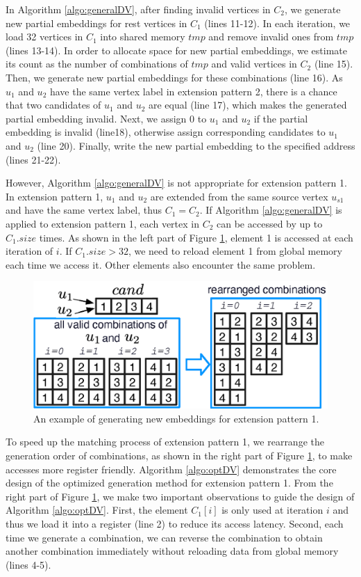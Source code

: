 In Algorithm \ref{algo:generalDV}, after finding invalid vertices in $C_2$, we generate new partial embeddings for rest vertices in $C_1$ (lines 11-12). In each iteration, we load 32 vertices in $C_1$ into shared memory $tmp$ and remove invalid ones from $tmp$ (lines 13-14). In order to allocate space for new partial embeddings, we estimate its count as the number of combinations of $tmp$ and valid vertices in $C_2$ (line 15). Then, we generate new partial embeddings for these combinations (line 16). As $u_1$ and $u_2$ have the same vertex label in extension pattern 2, there is a chance that two candidates of $u_1$ and $u_2$ are equal (line 17), which makes the generated partial embedding invalid. Next, we assign 0 to $u_1$ and $u_2$ if the partial embedding is invalid (line18), otherwise assign corresponding candidates to $u_1$ and $u_2$ (line 20). Finally, write the new partial embedding to the specified address (lines 21-22).

However, Algorithm \ref{algo:generalDV} is not appropriate for extension pattern 1. In extension pattern 1, $u_1$ and $u_2$ are extended from the same source vertex $u_{s1}$ and have the same vertex label, thus $C_1 = C_2$. If Algorithm \ref{algo:generalDV} is applied to extension pattern 1, each vertex in $C_2$ can be accessed by up to $C_1.size$ times. As shown in the left part of Figure \ref{fig:ep1opt}, element 1 is accessed at each iteration of $i$. If $C_1.size>32$, we need to reload element 1 from global memory each time we access it. Other elements also encounter the same problem.

\begin{figure}
\centering
\includegraphics[width=\columnwidth]{./figure/ep1opt.eps}
\caption{An example of generating new embeddings for extension pattern 1.}	
\label{fig:ep1opt}
\end{figure}

To speed up the matching process of extension pattern 1, we rearrange the generation order of combinations, as shown in the right part of Figure \ref{fig:ep1opt}, to make accesses more register friendly. Algorithm \ref{algo:optDV} demonstrates the core design of the optimized generation method for extension pattern 1. From the right part of Figure \ref{fig:ep1opt}, we make two important observations to guide the design of Algorithm \ref{algo:optDV}. First, the element $C_1[i]$ is only used at iteration $i$ and thus we load it into a register (line 2) to reduce its access latency. Second, each time we generate a combination, we can reverse the combination to obtain another combination immediately without reloading data from global memory (lines 4-5).

